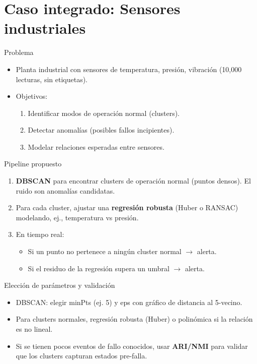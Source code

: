 \documentclass[aspectratio=169, 10pt, xcolor=table]{beamer}
\begin{document}
\section{Caso integrado: Sensores industriales}

\begin{frame}{Problema}
    \begin{itemize}
        \item Planta industrial con sensores de temperatura, presión, vibración (10,000 lecturas, sin etiquetas).
        \item Objetivos:
        \begin{enumerate}
            \item Identificar modos de operación normal (clusters).
            \item Detectar anomalías (posibles fallos incipientes).
            \item Modelar relaciones esperadas entre sensores.
        \end{enumerate}
    \end{itemize}
\end{frame}

\begin{frame}{Pipeline propuesto}
    \begin{enumerate}
        \item \textbf{DBSCAN} para encontrar clusters de operación normal (puntos densos). El ruido son anomalías candidatas.
        \item Para cada cluster, ajustar una \textbf{regresión robusta} (Huber o RANSAC) modelando, ej., temperatura vs presión.
        \item En tiempo real:
        \begin{itemize}
            \item Si un punto no pertenece a ningún cluster normal $\rightarrow$ alerta.
            \item Si el residuo de la regresión supera un umbral $\rightarrow$ alerta.
        \end{itemize}
    \end{enumerate}
\end{frame}

\begin{frame}{Elección de parámetros y validación}
    \begin{itemize}
        \item DBSCAN: elegir minPts (ej. 5) y eps con gráfico de distancia al 5-vecino.
        \item Para clusters normales, regresión robusta (Huber) o polinómica si la relación es no lineal.
        \item Si se tienen pocos eventos de fallo conocidos, usar \textbf{ARI/NMI} para validar que los clusters capturan estados pre-falla.
    \end{itemize}
\end{frame}
\end{document}
